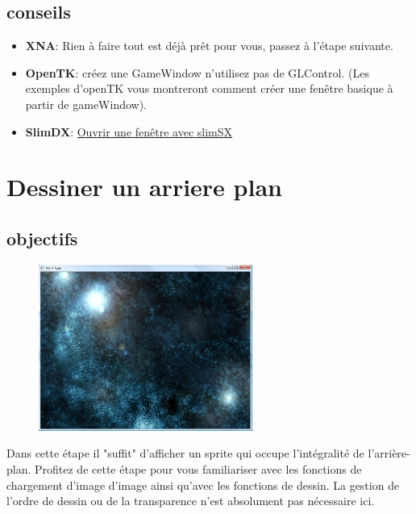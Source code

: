 \documentclass[12pt,a4paper]{report}
\begin{document}
\subsection{conseils}
\begin{itemize}
\item \textbf{XNA}: Rien à faire tout est déjà prêt pour vous, passez à l'étape suivante.
\item\textbf{OpenTK}: créez une GameWindow n'utilisez pas de GLControl. (Les exemples d'openTK vous montreront comment créer une fenêtre basique à partir de gameWindow).
\item \textbf{SlimDX}:  \href{http://slimdx.org/tutorials/DeviceCreation.php}{Ouvrir une fenêtre avec slimSX}
\end{itemize}
\newpage

\section{Dessiner un arriere plan}
\subsection{objectifs}
\begin{figure}[!h]\centering\includegraphics[width=7cm]{background_window.png}\end{figure}
Dans cette étape il "suffit" d'afficher un sprite qui occupe l'intégralité de l'arrière-plan. Profitez de cette étape pour
vous familiariser avec les fonctions de chargement d'image d'image ainsi qu'avec les fonctions de dessin.
La gestion de l'ordre de dessin ou de la transparence n'est absolument pas nécessaire ici.
\end{document}
